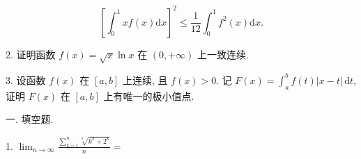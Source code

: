 \documentclass{examcollection}
\renewcommand{\displayformula}[1]{\[#1\]}
\begin{document}
{\begin{minipage}{\textwidth}
\displayformula{\left[ \int_ {0} ^ {1} x f (x) \mathrm{d} x \right] ^ {2} \leq \frac {1}{12} \int_ {0} ^ {1} f ^ {2} (x) \mathrm{d} x.}\par
2. 证明函数 $f(x) = \sqrt{x} \ln x$ 在 $(0, +\infty)$ 上一致连续.\par
3. 设函数 $f(x)$ 在 $[a, b]$ 上连续, 且 $f(x) > 0$. 记 $F(x) = \int_{a}^{b} f(t) |x - t| \, \mathrm{d}t$, 证明 $F(x)$ 在 $[a, b]$ 上有唯一的极小值点.\par
{}\smallskip
一. 填空题.\par
1. $\lim_{n\to \infty}\frac{\sum_{k = 1}^{n}\sqrt[k]{k^2 + 2^k}}{n} =$\par
\end{minipage}}
\ifdim\dimexpr\ht\proofbox+\dp\proofbox\relax>\textheight
\noindent\resizebox{!}{\textheight}{\usebox{\proofbox}}\else\noindent\usebox{\proofbox}\fi\clearpage
\end{document}
